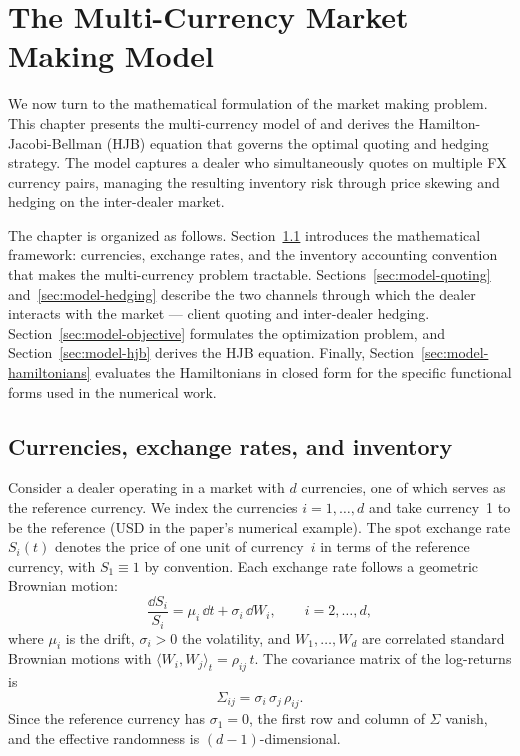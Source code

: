 \chapter{The Multi-Currency Market Making Model}
\label{ch:model}

We now turn to the mathematical formulation of the market making problem. This chapter presents the multi-currency model of \cite{barzykin2023} and derives the Hamilton-Jacobi-Bellman (HJB) equation that governs the optimal quoting and hedging strategy. The model captures a dealer who simultaneously quotes on multiple FX currency pairs, managing the resulting inventory risk through price skewing and hedging on the inter-dealer market.

The chapter is organized as follows. Section~\ref{sec:model-setup} introduces the mathematical framework: currencies, exchange rates, and the inventory accounting convention that makes the multi-currency problem tractable. Sections~\ref{sec:model-quoting} and~\ref{sec:model-hedging} describe the two channels through which the dealer interacts with the market --- client quoting and inter-dealer hedging. Section~\ref{sec:model-objective} formulates the optimization problem, and Section~\ref{sec:model-hjb} derives the HJB equation. Finally, Section~\ref{sec:model-hamiltonians} evaluates the Hamiltonians in closed form for the specific functional forms used in the numerical work.


\section{Currencies, exchange rates, and inventory}
\label{sec:model-setup}

Consider a dealer operating in a market with $d$ currencies, one of which serves as the reference currency. We index the currencies $i = 1, \ldots, d$ and take currency~1 to be the reference (USD in the paper's numerical example). The spot exchange rate $S_i(t)$ denotes the price of one unit of currency~$i$ in terms of the reference currency, with $S_1 \equiv 1$ by convention. Each exchange rate follows a geometric Brownian motion:
\begin{equation}
  \label{eq:exchange-rate}
  \frac{\dd S_i}{S_i} = \mu_i \, \dd t + \sigma_i \, \dd W_i, \qquad i = 2, \ldots, d,
\end{equation}
where $\mu_i$ is the drift, $\sigma_i > 0$ the volatility, and $W_1, \ldots, W_d$ are correlated standard Brownian motions with $\langle W_i, W_j \rangle_t = \rho_{ij}\, t$. The covariance matrix of the log-returns is
\[
  \Sigma_{ij} = \sigma_i\,\sigma_j\,\rho_{ij}.
\]
Since the reference currency has $\sigma_1 = 0$, the first row and column of $\Sigma$ vanish, and the effective randomness is $(d-1)$-dimensional.

